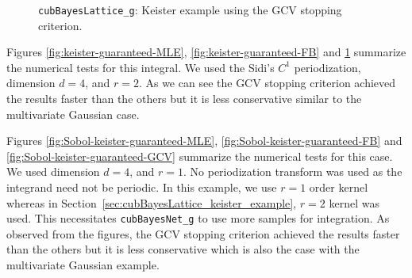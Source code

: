 \documentclass{iitthesis}          %
\newcommand{\code}[1]{\texttt{#1}}
\newcommand\secref{Section~\ref}
\begin{document}
{{{{{{\begin{figure}
	\caption[Lattice: Keister guaranteed: GCV]{\code{cubBayesLattice\_g}: Keister example using the GCV stopping criterion.}
	\label{fig:keister-guaranteed-GCV}
\end{figure}
Figures \ref{fig:keister-guaranteed-MLE}, \ref{fig:keister-guaranteed-FB} and \ref{fig:keister-guaranteed-GCV} summarize the numerical tests for this integral.  We used the Sidi's $C^1$ periodization, dimension $d=4$, and $r=2$. 
As we can see the GCV stopping criterion achieved the results faster than the others but it is less conservative similar to the multivariate Gaussian case.

\Subsection{Using \code{cubBayesNet\_g}}
Figures \ref{fig:Sobol-keister-guaranteed-MLE}, \ref{fig:Sobol-keister-guaranteed-FB} and \ref{fig:Sobol-keister-guaranteed-GCV} summarize the numerical tests for this case. We used  dimension $d=4$, and $r=1$.  No periodization transform was used as the integrand need not be periodic. 
In this example, we use $r=1$ order kernel whereas in \secref{sec:cubBayesLattice_keister_example}, $r=2$ kernel was used. This necessitates \code{cubBayesNet\_g} to use more samples for integration.
As observed from the figures, the GCV stopping criterion achieved the results faster than the others but it is less conservative which is also the case with the multivariate Gaussian example.

}}}}}}
\end{document}
